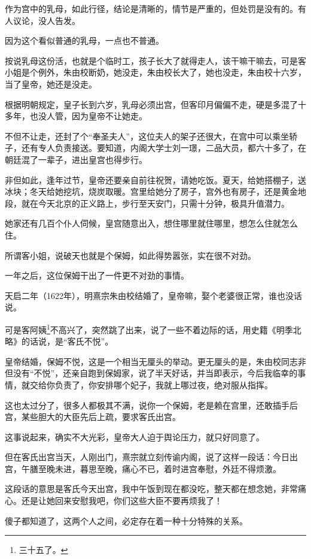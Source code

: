 \begin{multicols}{\theparacolNo}
		作为宫中的乳母，如此行径，结论是清晰的，情节是严重的，但处罚是没有的。有人议论，没人告发。

		因为这个看似普通的乳母，一点也不普通。

		按说乳母这份活，也就是个临时工，孩子长大了就得走人，该干嘛干嘛去，可是客小姐是个例外，朱由校断奶，她没走，朱由校长大了，她也没走，朱由校十六岁，当了皇帝，她还是没走。

		根据明朝规定，皇子长到六岁，乳母必须出宫，但客印月偏偏不走，硬是多混了十多年，也没人管，因为皇帝不让她走。

		不但不让走，还封了个“奉圣夫人”，这位夫人的架子还很大，在宫中可以乘坐轿子，还有专人负责接送。要知道，内阁大学士刘一璟，二品大员，都六十多了，在朝廷混了一辈子，进出皇宫也得步行。

		非但如此，逢年过节，皇帝还要亲自前往祝贺，请她吃饭。夏天，给她搭棚子，送冰块；冬天给她挖坑，烧炭取暖。宫里给她分了房子，宫外也有房子，还是黄金地段，就在今天北京的正义路上，步行至天安门，只需十分钟，极具升值潜力。

		她家还有几百个仆人伺候，皇宫随意出入，想住哪里就住哪里，想怎么住就怎么住。

		所谓客小姐，说破天也就是个保姆，如此得势嚣张，实在很不对劲。

		一年之后，这位保姆干出了一件更不对劲的事情。

		天启二年（1622年），明熹宗朱由校结婚了，皇帝嘛，娶个老婆很正常，谁也没话说。

		可是客阿姨\footnote{三十五了。}不高兴了，突然跳了出来，说了一些不着边际的话，用史籍《明季北略》的话说，是“客氏不悦”。

		皇帝结婚，保姆不悦，这是一个相当无厘头的举动。更无厘头的是，朱由校同志非但没有“不悦”，还亲自跑到保姆家，说了半天好话，并当即表示，今后我临幸的事情，就交给你负责了，你安排哪个妃子，我就上哪过夜，绝对服从指挥。

		这也太过分了，很多人都极其不满，说你一个保姆，老是赖在宫里，还敢插手后宫，某些胆大的大臣先后上疏，要求客氏出宫。

		这事说起来，确实不大光彩，皇帝大人迫于舆论压力，就只好同意了。

		但在客氏出宫当天，人刚出门，熹宗就立刻传谕内阁，说了这样一段话：今日出宫，午膳至晚未进，暮思至晚，痛心不已，着时进宫奉慰，外廷不得烦激。

		这段话的意思是客氏今天出宫，我中午饭到现在都没吃，整天都在想念她，非常痛心。还是让她回来安慰我吧，你们这些大臣不要再烦我了！

		傻子都知道了，这两个人之间，必定存在着一种十分特殊的关系。


\end{multicols}
